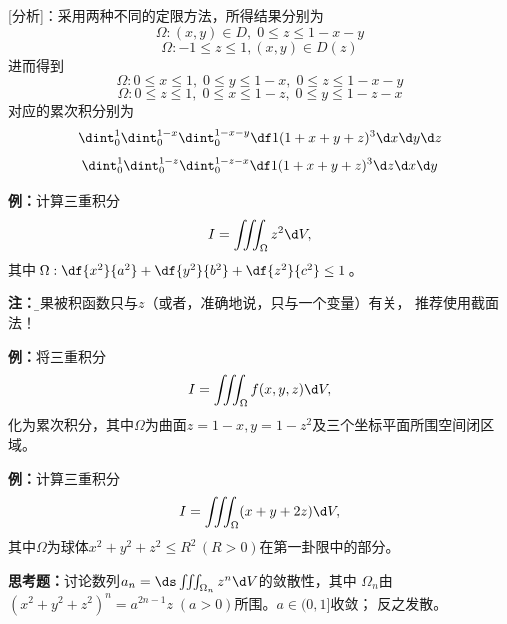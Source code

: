 [分析]：采用两种不同的定限方法，所得结果分别为
$$\Omega:(x,y)\in D,\;0\leq z\leq 1-x-y$$
$$\Omega:-1\leq z\leq 1,(x,y)\in D(z)$$
进而得到
$$\Omega:0\leq x\leq 1,\;0\leq y\leq 1-x,\;0\leq z\leq 1-x-y$$
$$\Omega:0\leq z\leq 1,\;0\leq x\leq 1-z,\;0\leq y\leq 1-z-x$$
对应的累次积分别为
$$\dint_0^1\dint_0^{1-x}\dint_0^{1-x-y}\df1{(1+x+y+z)^3}\d x\d y\d z$$
$$\dint_0^1\dint_0^{1-z}\dint_0^{1-z-x}\df1{(1+x+y+z)^3}\d z\d x\d y$$


{\bf 例：}计算三重积分
$$I=\iiint_{\Omega}z^2\d V,$$
其中$\Omega:\df{x^2}{a^2}+\df{y^2}{b^2}+\df{z^2}{c^2}\leq 1$。

\begin{center}
\end{center}

{\bf 注：}{\b 如果被积函数只与$z$（或者，准确地说，只与一个变量）有关，
推荐使用截面法！}

{\bf 例：}将三重积分
$$I=\iiint_{\Omega}f(x,y,z)\d V,$$
化为累次积分，其中$\Omega$为曲面$z=1-x,y=1-z^2$及三个坐标平面所围空间闭区域。

{\bf 例：}计算三重积分
$$I=\iiint_{\Omega}(x+y+2z)\d V,$$
其中$\Omega$为球体$x^2+y^2+z^2\leq R^2\,(R>0)$在第一卦限中的部分。

{\bf 思考题：}讨论数列$a_n=\ds\iiint_{\Omega_n}z^n\d V$的敛散性，其中
$\Omega_n$由$(x^2+y^2+z^2)^n=a^{2n-1}z\;(a>0)$所围。\hfill $a\in(0,1]$收敛；
反之发散。

